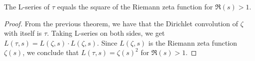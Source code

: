 \begin{theorem}
\label{LSeries_tau_eq_riemannZeta_sq}
\leanok
The L-series of $\tau$ equals the square of the Riemann zeta function for $\Re(s) > 1$.
\end{theorem}
\begin{proof}
\leanok
From the previous theorem, we have that the Dirichlet convolution of $\zeta$ with itself is $\tau$.
  Taking L-series on both sides, we get $L(\tau, s) = L(\zeta, s) \cdot L(\zeta, s)$.
  Since $L(\zeta, s)$ is the Riemann zeta function $\zeta(s)$, we conclude that
  $L(\tau, s) = \zeta(s)^2$ for $\Re(s) > 1$.
\end{proof}
